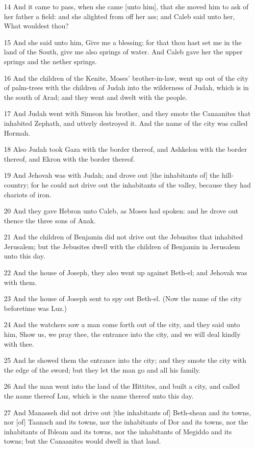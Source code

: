 \par 14 And it came to pass, when she came [unto him], that she moved him to ask of her father a field: and she alighted from off her ass; and Caleb said unto her, What wouldest thou?
\par 15 And she said unto him, Give me a blessing; for that thou hast set me in the land of the South, give me also springs of water. And Caleb gave her the upper springs and the nether springs.
\par 16 And the children of the Kenite, Moses' brother-in-law, went up out of the city of palm-trees with the children of Judah into the wilderness of Judah, which is in the south of Arad; and they went and dwelt with the people.
\par 17 And Judah went with Simeon his brother, and they smote the Canaanites that inhabited Zephath, and utterly destroyed it. And the name of the city was called Hormah.
\par 18 Also Judah took Gaza with the border thereof, and Ashkelon with the border thereof, and Ekron with the border thereof.
\par 19 And Jehovah was with Judah; and drove out [the inhabitants of] the hill-country; for he could not drive out the inhabitants of the valley, because they had chariots of iron.
\par 20 And they gave Hebron unto Caleb, as Moses had spoken: and he drove out thence the three sons of Anak.
\par 21 And the children of Benjamin did not drive out the Jebusites that inhabited Jerusalem; but the Jebusites dwell with the children of Benjamin in Jerusalem unto this day.
\par 22 And the house of Joseph, they also went up against Beth-el; and Jehovah was with them.
\par 23 And the house of Joseph sent to spy out Beth-el. (Now the name of the city beforetime was Luz.)
\par 24 And the watchers saw a man come forth out of the city, and they said unto him, Show us, we pray thee, the entrance into the city, and we will deal kindly with thee.
\par 25 And he showed them the entrance into the city; and they smote the city with the edge of the sword; but they let the man go and all his family.
\par 26 And the man went into the land of the Hittites, and built a city, and called the name thereof Luz, which is the name thereof unto this day.
\par 27 And Manasseh did not drive out [the inhabitants of] Beth-shean and its towns, nor [of] Taanach and its towns, nor the inhabitants of Dor and its towns, nor the inhabitants of Ibleam and its towns, nor the inhabitants of Megiddo and its towns; but the Canaanites would dwell in that land.
